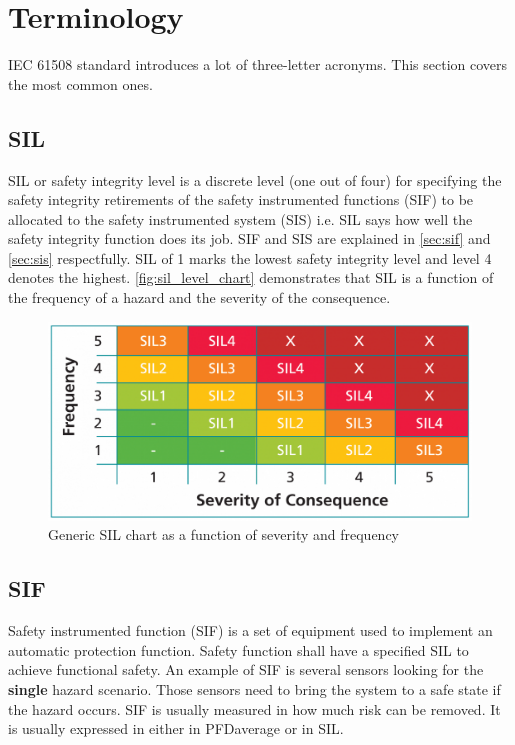 \section{Terminology}

IEC 61508 standard introduces a lot of three-letter acronyms. This section covers the most common ones.

\subsection{SIL}

SIL or safety integrity level is a discrete level (one out of four) for specifying the safety integrity retirements of the safety instrumented functions (SIF) to be allocated to the safety instrumented system (SIS) i.e. SIL says how well the safety integrity function does its job. SIF and SIS are explained in \autoref{sec:sif}  and \autoref{sec:sis} respectfully. SIL of 1 marks the lowest safety integrity level and level 4 denotes the highest.  \autoref{fig:sil_level_chart} demonstrates that SIL is a function of the frequency of a hazard and the severity of the consequence. 


\begin{figure}[H]

      \centering
      \includegraphics[width=0.7\linewidth]{images/sil_level_chart.png}
      \caption{Generic SIL chart as a function of severity and frequency}
      \label{fig:sil_level_chart}
    
\end{figure}

\subsection{SIF}
\label{sec:sif}

Safety instrumented function (SIF) is a set of equipment used to implement an automatic protection function. Safety function shall have a specified SIL to achieve functional safety. 
An example of SIF is several sensors looking for the \textbf{single} hazard scenario. Those sensors need to bring the system to a safe state if the hazard occurs. SIF is usually measured in how much risk can be removed. It is usually expressed in either in PFDaverage or in SIL. 

